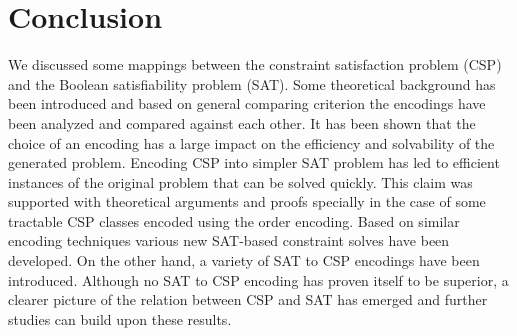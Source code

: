 \section{Conclusion}\label{sec:conclusion}
We discussed some mappings between the constraint satisfaction problem (CSP) and the Boolean satisfiability problem (SAT). Some theoretical background has been introduced and based on general comparing criterion the encodings have been analyzed and compared against each other. It has been shown that the choice of an encoding has a large impact on the efficiency and solvability of the generated problem. Encoding CSP into simpler SAT problem has led to efficient instances of the original problem that can be solved quickly. This claim was supported with theoretical arguments and proofs specially in the case of some tractable CSP classes encoded using the order encoding. Based on similar encoding techniques various new SAT-based constraint solves have been developed. On the other hand, a variety of SAT to CSP encodings have been introduced. Although no SAT to CSP encoding has proven itself to be superior, a clearer picture of the relation between CSP and SAT has emerged and further studies can build upon these results.